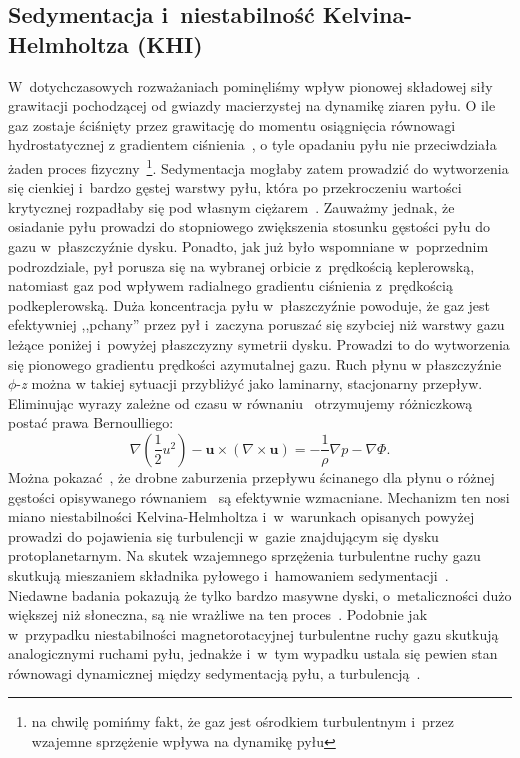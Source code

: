 \subsection{Sedymentacja i~niestabilność Kelvina-Helmholtza (KHI)}
W~dotychczasowych rozważaniach pominęliśmy wpływ pionowej składowej siły
grawitacji pochodzącej od gwiazdy macierzystej na dynamikę ziaren pyłu. O ile
gaz zostaje ściśnięty przez grawitację do momentu osiągnięcia równowagi
hydrostatycznej z gradientem ciśnienia~, o tyle opadaniu pyłu nie
przeciwdziała żaden proces fizyczny~\footnote{na chwilę pomińmy fakt, że gaz
jest ośrodkiem turbulentnym i~przez wzajemne sprzężenie wpływa na dynamikę
pyłu}. Sedymentacja mogłaby zatem prowadzić do wytworzenia się cienkiej i~bardzo
gęstej warstwy pyłu, która po przekroczeniu wartości krytycznej rozpadłaby się
pod własnym ciężarem~\citep{GW73}. Zauważmy jednak, że osiadanie pyłu prowadzi
do stopniowego zwiększenia stosunku gęstości pyłu do gazu w~płaszczyźnie dysku.
Ponadto, jak już było wspomniane w~poprzednim podrozdziale, pył porusza się na
wybranej orbicie z~prędkością keplerowską, natomiast gaz pod wpływem radialnego
gradientu ciśnienia z~prędkością podkeplerowską. Duża koncentracja pyłu
w~płaszczyźnie powoduje, że gaz jest efektywniej ,,pchany'' przez pył i~zaczyna
poruszać się szybciej niż warstwy gazu leżące poniżej i~powyżej płaszczyzny
symetrii dysku. Prowadzi to do wytworzenia się pionowego gradientu prędkości
azymutalnej gazu. Ruch płynu w płaszczyźnie $\phi$-\emph{z} można w takiej sytuacji
przybliżyć jako laminarny, stacjonarny przepływ. Eliminując wyrazy zależne od
czasu w równaniu~ otrzymujemy różniczkową postać prawa
Bernoulliego:
\begin{equation}
   \nabla\left(\frac{1}{2}u^2\right) -
   \mathbf{u}\times\left(\nabla\times\mathbf{u}\right) =
-\frac{1}{\rho}\nabla p - \nabla\Phi.
   \label{eq:bern}
\end{equation}
Można pokazać~\cite{C98}, że drobne zaburzenia przepływu ścinanego dla płynu o
różnej gęstości opisywanego równaniem~ są efektywnie wzmacniane.
Mechanizm ten nosi miano niestabilności Kelvina-Helmholtza i~w~warunkach
opisanych powyżej prowadzi do pojawienia się turbulencji w~gazie znajdującym się
dysku protoplanetarnym. Na skutek wzajemnego sprzężenia turbulentne ruchy gazu
skutkują mieszaniem składnika pyłowego i~hamowaniem sedymentacji~\cite{JHK06}.
Niedawne badania pokazują że tylko bardzo masywne dyski, o~metaliczności dużo
większej niż słoneczna, są nie wrażliwe na ten proces~\citep{L10}. Podobnie jak
w~przypadku niestabilności magnetorotacyjnej turbulentne ruchy gazu skutkują
analogicznymi ruchami pyłu, jednakże i~w~tym wypadku ustala się pewien stan
równowagi dynamicznej między sedymentacją pyłu, a turbulencją~\cite{JHK06}. 

